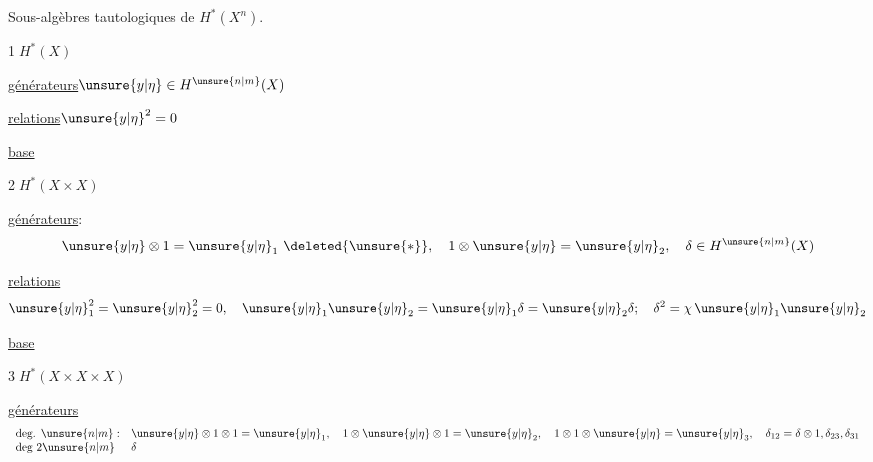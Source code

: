 
Sous-algèbres tautologiques de $H^*(X^n)$.

\textcircled{1}\quad\uline{$H^*(X)$}

\uline{générateurs}\quad $\unsure{y|\eta}\in H^{\unsure{n|m}}(X)$

\uline{relations}\quad $\unsure{y|\eta}^2=0$

\uline{base}

\textcircled{2}\quad\uline{$H^*(X\times X)$}

\uline{générateurs}:
\[
\unsure{y|\eta}\otimes1=\unsure{y|\eta}_1\ \deleted{\unsure{*}},\quad
1\otimes\unsure{y|\eta}=\unsure{y|\eta}_2,\quad
\delta\in H^{\unsure{n|m}}(X)
\]

\uline{relations}
\[
\unsure{y|\eta}_1^2=\unsure{y|\eta}_2^2=0,\quad
\unsure{y|\eta}_1\unsure{y|\eta}_2=\unsure{y|\eta}_1\delta=\unsure{y|\eta}_2\delta;\quad
\delta^2=\chi\,\unsure{y|\eta}_1\unsure{y|\eta}_2
\]

\uline{base}

\textcircled{3}\quad $H^*(X\times X\times X)$

\uline{générateurs}
\[
\begin{array}{ll}
\text{deg. }\unsure{n|m}:&
\unsure{y|\eta}\otimes1\otimes1=\unsure{y|\eta}_1,\quad
1\otimes\unsure{y|\eta}\otimes1=\unsure{y|\eta}_2,\quad
1\otimes1\otimes\unsure{y|\eta}=\unsure{y|\eta}_3,\quad
\delta_{12}=\delta\otimes1,\delta_{23},\delta_{31}\\
\text{deg }2\unsure{n|m}&\delta
\end{array}
\]


